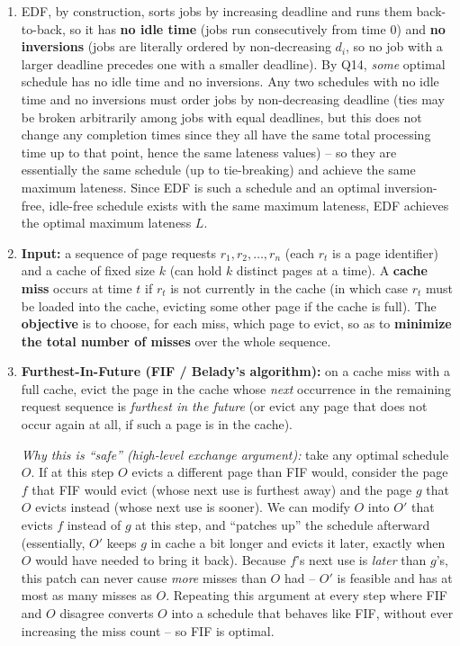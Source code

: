 \documentclass[11pt]{article}
\begin{document}
\begin{enumerate}[label=\textbf{A\arabic*.}, leftmargin=2.2em]
\item EDF, by construction, sorts jobs by increasing deadline and runs them back-to-back,
so it has \textbf{no idle time} (jobs run consecutively from time 0) and \textbf{no
inversions} (jobs are literally ordered by non-decreasing $d_i$, so no job with a larger
deadline precedes one with a smaller deadline). By Q14, \emph{some} optimal schedule has
no idle time and no inversions. Any two schedules with no idle time and no inversions
must order jobs by non-decreasing deadline (ties may be broken arbitrarily among jobs with
equal deadlines, but this does not change any completion times since they all have the
same total processing time up to that point, hence the same lateness values) -- so they
are essentially the same schedule (up to tie-breaking) and achieve the same maximum
lateness. Since EDF is such a schedule and an optimal inversion-free, idle-free schedule
exists with the same maximum lateness, EDF achieves the optimal maximum lateness $L$.

\item \textbf{Input:} a sequence of page requests $r_1, r_2, \ldots, r_n$ (each $r_t$ is a
page identifier) and a cache of fixed size $k$ (can hold $k$ distinct pages at a time). A
\textbf{cache miss} occurs at time $t$ if $r_t$ is not currently in the cache (in which
case $r_t$ must be loaded into the cache, evicting some other page if the cache is full).
The \textbf{objective} is to choose, for each miss, which page to evict, so as to
\textbf{minimize the total number of misses} over the whole sequence.

\item \textbf{Furthest-In-Future (FIF / Belady's algorithm):} on a cache miss with a full
cache, evict the page in the cache whose \emph{next} occurrence in the remaining request
sequence is \emph{furthest in the future} (or evict any page that does not occur again at
all, if such a page is in the cache).

\textit{Why this is ``safe'' (high-level exchange argument):} take any optimal schedule
$O$. If at this step $O$ evicts a different page than FIF would, consider the page $f$
that FIF would evict (whose next use is furthest away) and the page $g$ that $O$ evicts
instead (whose next use is sooner). We can modify $O$ into $O'$ that evicts $f$ instead of
$g$ at this step, and ``patches up'' the schedule afterward (essentially, $O'$ keeps $g$
in cache a bit longer and evicts it later, exactly when $O$ would have needed to bring it
back). Because $f$'s next use is \emph{later} than $g$'s, this patch can never cause
\emph{more} misses than $O$ had -- $O'$ is feasible and has at most as many misses as $O$.
Repeating this argument at every step where FIF and $O$ disagree converts $O$ into a
schedule that behaves like FIF, without ever increasing the miss count -- so FIF is
optimal.


\end{enumerate}
\end{document}
